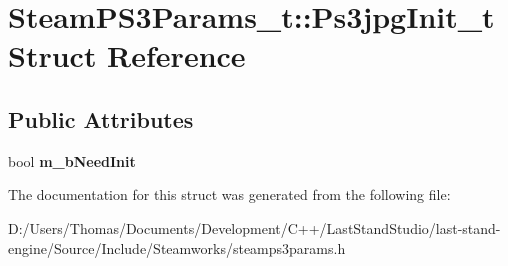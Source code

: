 \hypertarget{structSteamPS3Params__t_1_1Ps3jpgInit__t}{}\section{Steam\+P\+S3\+Params\+\_\+t\+:\+:Ps3jpg\+Init\+\_\+t Struct Reference}
\label{structSteamPS3Params__t_1_1Ps3jpgInit__t}
\subsection*{Public Attributes}
\begin{DoxyCompactItemize}
\item 
\hypertarget{structSteamPS3Params__t_1_1Ps3jpgInit__t_a33a5eb95db6a7c5d5bedaf521869eb39}{}bool {\bfseries m\+\_\+b\+Need\+Init}\label{structSteamPS3Params__t_1_1Ps3jpgInit__t_a33a5eb95db6a7c5d5bedaf521869eb39}

\end{DoxyCompactItemize}


The documentation for this struct was generated from the following file\+:\begin{DoxyCompactItemize}
\item 
D\+:/\+Users/\+Thomas/\+Documents/\+Development/\+C++/\+Last\+Stand\+Studio/last-\/stand-\/engine/\+Source/\+Include/\+Steamworks/steamps3params.\+h\end{DoxyCompactItemize}
